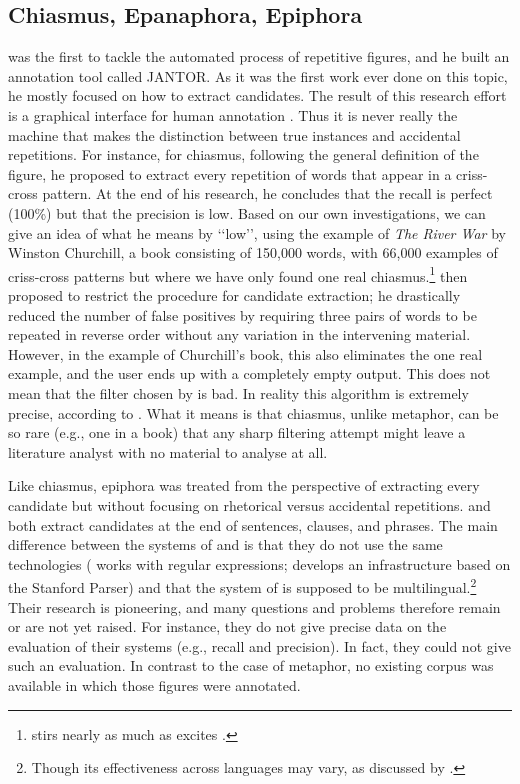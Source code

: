 \subsection{Chiasmus, Epanaphora, Epiphora}
\cite{gawr} was the first to tackle the automated process of repetitive figures, and he built an annotation tool called JANTOR. As it was the first work ever done on this topic, he mostly focused on how to extract candidates. The result of this research effort is a graphical interface for human annotation \cite[p.94]{gawr}. Thus it is never really the machine that makes the distinction between true instances and accidental repetitions. For instance, for chiasmus, following the general definition of the figure, he proposed to extract every repetition of words that appear in a criss-cross pattern. At the end of his research, he concludes that the recall is perfect (100\%) but that the precision is low. %
 Based on our own investigations, we can give an idea of what he means by `‘low’', using the example of \textit{The River War} by Winston Churchill, a book consisting of 150,000 words, with 66,000 examples of criss-cross patterns but where we have only found  one real chiasmus.\footnote{ stirs  nearly as much as  excites .\label{exAmbition}} \cite{hromada} then proposed to restrict the procedure for candidate extraction; he drastically reduced the number of false positives by requiring three pairs of words to be repeated in reverse order without any variation in the intervening material. However, in the example of Churchill's book, this also eliminates the one real example, and the user ends up with a completely empty output.  This does not mean that the filter chosen by \cite{hromada} is bad. In reality this algorithm is extremely precise, according to \cite{Dubremetz2012}. What it means is that chiasmus, unlike metaphor, can be so rare (e.g., one in a book) that any sharp filtering attempt might leave a literature analyst with no material to analyse at all.

Like chiasmus, epiphora was treated from the perspective of extracting every candidate but without focusing on rhetorical versus accidental repetitions. \citet{gawr} and \citet{hromada} both extract candidates at the end of sentences, clauses, and phrases. The main difference between the systems of \cite{gawr} and \cite{hromada} is that they do not use the same technologies (\cite{hromada} works with regular expressions; \citet{gawr} develops an infrastructure based on the Stanford Parser) and that the system of \cite{hromada} is supposed to be multilingual.\footnote{Though its effectiveness across languages may vary, as discussed by \citet{Dubremetz2012}.} Their research is pioneering, and many questions and problems therefore remain or are not yet raised. For instance, they do not give precise data on the evaluation of their systems (e.g., recall and precision). In fact, they could not give such an evaluation. In contrast to the case of metaphor, no existing corpus was available in which those figures were annotated.


